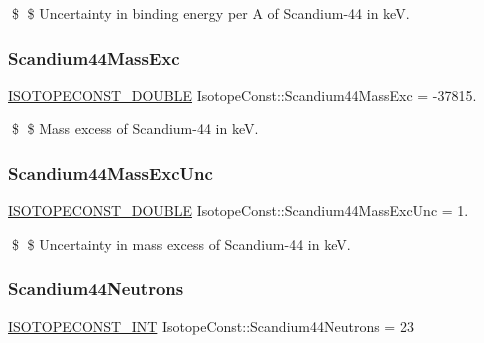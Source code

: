 \$ \$ Uncertainty in binding energy per A of Scandium-\/44 in keV. \mbox{\label{group___isotope_const-_scandium-_sc44_ga5975b2500b8f6c762053f651af386b1a}} 
\subsubsection{\texorpdfstring{Scandium44\+Mass\+Exc}{Scandium44MassExc}}
{\footnotesize\ttfamily \mbox{\hyperlink{group___isotope_const-_macros_ga8f45a7272ce02c0b4c65c44636ed719a}{I\+S\+O\+T\+O\+P\+E\+C\+O\+N\+S\+T\+\_\+\+D\+O\+U\+B\+LE}} Isotope\+Const\+::\+Scandium44\+Mass\+Exc = -\/37815.}

\$ \$ Mass excess of Scandium-\/44 in keV. \mbox{\label{group___isotope_const-_scandium-_sc44_ga707bc2cf7d4140f1cdea690db144c3fd}} 
\subsubsection{\texorpdfstring{Scandium44\+Mass\+Exc\+Unc}{Scandium44MassExcUnc}}
{\footnotesize\ttfamily \mbox{\hyperlink{group___isotope_const-_macros_ga8f45a7272ce02c0b4c65c44636ed719a}{I\+S\+O\+T\+O\+P\+E\+C\+O\+N\+S\+T\+\_\+\+D\+O\+U\+B\+LE}} Isotope\+Const\+::\+Scandium44\+Mass\+Exc\+Unc = 1.}

\$ \$ Uncertainty in mass excess of Scandium-\/44 in keV. \mbox{\label{group___isotope_const-_scandium-_sc44_ga62582b7ac95997bd7b01f39fcdba43f9}} 
\subsubsection{\texorpdfstring{Scandium44\+Neutrons}{Scandium44Neutrons}}
{\footnotesize\ttfamily \mbox{\hyperlink{group___isotope_const-_macros_ga5f18360b3e99483a35c32d789e62621c}{I\+S\+O\+T\+O\+P\+E\+C\+O\+N\+S\+T\+\_\+\+I\+NT}} Isotope\+Const\+::\+Scandium44\+Neutrons = 23}

